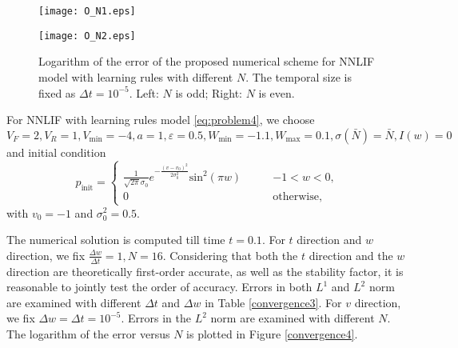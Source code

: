 \begin{figure}[!htb]
    \centering
        \begin{minipage}[c]{0.49\textwidth}
            \centering
            \texttt{[image: O\_N1.eps]}
        \end{minipage}
        \begin{minipage}[c]{0.49\textwidth}
            \centering
            \texttt{[image: O\_N2.eps]}
        \end{minipage}
		\caption{Logarithm of the error of the proposed numerical scheme for NNLIF model with learning rules with different $N$. The temporal size is fixed as $\Delta t=10^{-5}$. Left: $N$ is odd; Right: $N$ is even.}
  \label{convergence2}
\end{figure}


For NNLIF with learning rules model \eqref{eq:problem4}, we choose $V_F=2,V_R=1,V_{\text{min}}=-4,a=1,\varepsilon=0.5,W_{\text{min}}=-1.1,W_{\text{max}}=0.1,\sigma(\bar{N})=\bar{N}, I(w)=0$ and initial condition
\begin{equation}
    p_{\text{init}}=\begin{cases}
        \frac{1}{\sqrt{2 \pi} \sigma_{0} } e^{-\frac{\left(v-v_{0}\right)^{2}}{2 \sigma_{0}^{2}}}\text{sin}^2(\pi w) \qquad &-1<w<0,\\
        0 &\text{otherwise},
    \end{cases}
\end{equation}
with $v_0=-1$ and $\sigma_0^2=0.5$.

The numerical solution is computed till time $t=0.1$. For $t$ direction and $w$ direction, we fix $\frac{\Delta w}{\Delta t}=1, N=16$. Considering that both the $t$ direction and the $w$ direction are theoretically first-order accurate, as well as the stability factor, it is reasonable to jointly test the order of accuracy. Errors in both $L^{1}$ and $L^2$ norm are examined with different $\Delta t$ and $\Delta w$ in Table \ref{convergence3}. For $v$ direction, we fix ${\Delta w}={\Delta t}=10^{-5}$. Errors in the $L^2$ norm are examined with different $N$. The logarithm of the error versus $N$ is plotted in Figure \ref{convergence4}.

